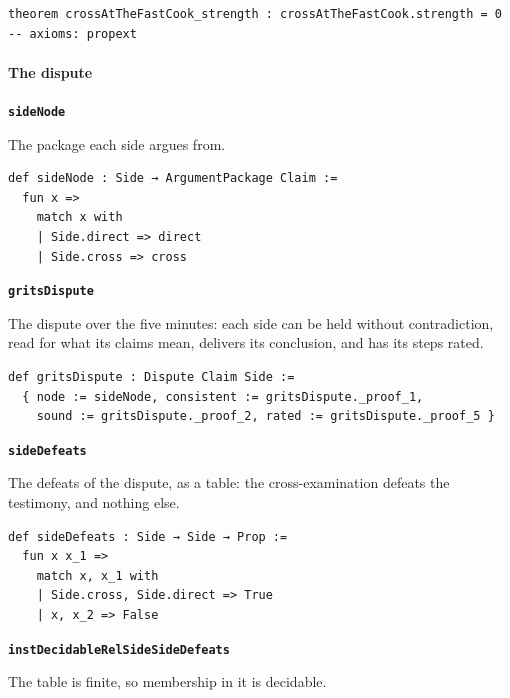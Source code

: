 \documentclass[11pt]{article}
\begin{document}
{\small\begin{verbatim}
theorem crossAtTheFastCook_strength : crossAtTheFastCook.strength = 0
-- axioms: propext
\end{verbatim}}
\paragraph*{The dispute}
\leavevmode\par\nobreak
\par\medskip\noindent\textbf{\texttt{side\allowbreak{}Node}}\par\nobreak\noindent
The package each side argues from.

{\small\begin{verbatim}
def sideNode : Side → ArgumentPackage Claim :=
  fun x =>
    match x with
    | Side.direct => direct
    | Side.cross => cross
\end{verbatim}}
\par\medskip\noindent\textbf{\texttt{grits\allowbreak{}Dispute}}\par\nobreak\noindent
The dispute over the five minutes: each side can be held without contradiction, read for what its claims mean, delivers its conclusion, and has its steps rated.

{\small\begin{verbatim}
def gritsDispute : Dispute Claim Side :=
  { node := sideNode, consistent := gritsDispute._proof_1,
    sound := gritsDispute._proof_2, rated := gritsDispute._proof_5 }
\end{verbatim}}
\par\medskip\noindent\textbf{\texttt{side\allowbreak{}Defeats}}\par\nobreak\noindent
The defeats of the dispute, as a table: the cross-examination defeats the testimony, and nothing else.

{\small\begin{verbatim}
def sideDefeats : Side → Side → Prop :=
  fun x x_1 =>
    match x, x_1 with
    | Side.cross, Side.direct => True
    | x, x_2 => False
\end{verbatim}}
\par\medskip\noindent\textbf{\texttt{inst\allowbreak{}Decidable\allowbreak{}Rel\allowbreak{}Side\allowbreak{}Side\allowbreak{}Defeats}}\par\nobreak\noindent
The table is finite, so membership in it is decidable.
\end{document}
